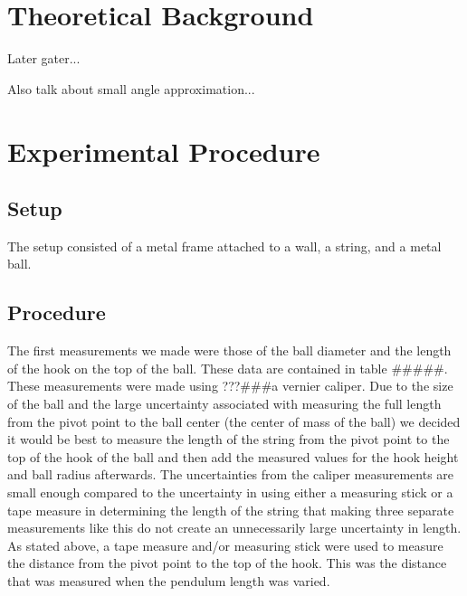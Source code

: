 \documentclass[iop,numberedappendix,appendixfloats]{emulateapj}
\begin{document}
\section{Theoretical Background}
\label{sec:theory}


Later gater...

Also talk about small angle approximation...






\section{Experimental Procedure}
\label{sec:procedure}

\subsection{Setup}

The setup consisted of a metal frame attached to a wall, a string, and a metal 
ball.

\subsection{Procedure}

The first measurements we made were those of the ball diameter and the length 
of the hook on the top of the ball.  These data are contained in table \#\#\#\#\#. 
These measurements were made using ???\#\#\#a vernier caliper.  Due to the size of 
the ball and the large uncertainty associated with measuring the full length 
from the pivot point to the ball center (the center of mass of the
ball) we decided it would be best to measure the length of the string from the
pivot point to the top of the hook of the ball and then add the measured values 
for the hook height and ball radius afterwards.  The uncertainties from the 
caliper measurements are small enough compared to the uncertainty in using 
either a measuring stick or a tape measure in determining the length of the
string that making three separate measurements like this do not create an 
unnecessarily large uncertainty in length.  As stated above, a tape measure 
and/or measuring stick were used to measure the distance from the pivot point
to the top of the hook.  This was the distance that was measured when the
pendulum length was varied.
\end{document}
